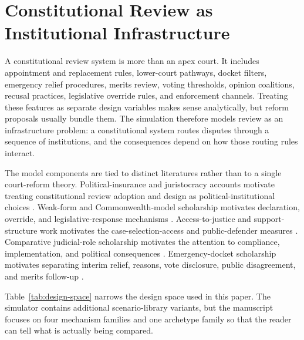 \documentclass[
  journal=small,
  manuscript=research-article,
  year=2026
]{cup-journal}
\begin{document}
\section{Constitutional Review as Institutional Infrastructure}
\label{sec:infrastructure}

A constitutional review system is more than an apex court. It includes appointment and replacement rules, lower-court pathways, docket filters, emergency relief procedures, merits review, voting thresholds, opinion coalitions, recusal practices, legislative override rules, and enforcement channels. Treating these features as separate design variables makes sense analytically, but reform proposals usually bundle them. The simulation therefore models review as an infrastructure problem: a constitutional system routes disputes through a sequence of institutions, and the consequences depend on how those routing rules interact.

The model components are tied to distinct literatures rather than to a single court-reform theory. Political-insurance and juristocracy accounts motivate treating constitutional review adoption and design as political-institutional choices \citep{hirschl2004,ginsburgVersteeg2014}. Weak-form and Commonwealth-model scholarship motivates declaration, override, and legislative-response mechanisms \citep{gardbaum2013}. Access-to-justice and support-structure work motivates the case-selection-access and public-defender measures \citep{epp1998}. Comparative judicial-role scholarship motivates the attention to compliance, implementation, and political consequences \citep{kapiszewski2013}. Emergency-docket scholarship motivates separating interim relief, reasons, vote disclosure, public disagreement, and merits follow-up \citep{baude2015,vladeck2023}.

Table~\ref{tab:design-space} narrows the design space used in this paper. The simulator contains additional scenario-library variants, but the manuscript focuses on four mechanism families and one archetype family so that the reader can tell what is actually being compared.
\end{document}
